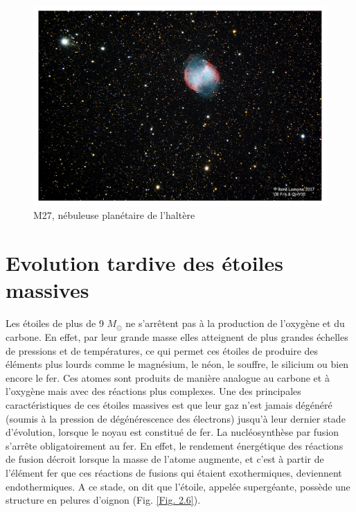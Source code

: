 \begin{figure}[H]\vspace{1cm}
	\centering
	\includegraphics[scale=0.4]{images/m27}
	\caption[M27, nébuleuse planétaire de l'haltère - astrophoto prise par René Lemoine le 30 juillet 2017 avec un Celestron 8 (1h50 de pose)]{M27, nébuleuse planétaire de l'haltère}
	\label{Fig. 2.5}
\end{figure}  

\section{Evolution tardive des étoiles massives}\label{2.4}

Les étoiles de plus de 9 $M_\odot$ ne s’arrêtent pas à la production de l’oxygène et du carbone. En effet, par leur grande masse elles atteignent de plus grandes échelles de pressions et de températures, ce qui permet ces étoiles de produire des éléments plus lourds comme le magnésium, le néon, le souffre, le silicium ou bien encore le fer. Ces atomes sont produits de manière analogue au carbone et à l’oxygène mais avec des réactions plus complexes. Une des principales caractéristiques de ces étoiles massives est que leur gaz n’est jamais dégénéré (soumis à la pression de dégénérescence des électrons) jusqu’à leur dernier stade d’évolution, lorsque le noyau est constitué de fer. La nucléosynthèse par fusion s’arrête obligatoirement au fer. En effet, le rendement énergétique des réactions de fusion décroit lorsque la masse de l’atome augmente, et c’est à partir de l’élément fer que ces réactions de fusions qui étaient exothermiques, deviennent endothermiques. A ce stade, on dit que l’étoile, appelée supergéante, possède une structure en pelures d’oignon (Fig. \ref{Fig. 2.6}).

